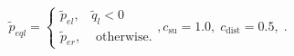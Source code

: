 \documentclass[14pt,handout,utf8]{beamer}
\begin{document}
\begin{frame}
  \vspace{-7ex}

  \begin{equation}
    \tilde{p}_{eql}
    =
    \begin{cases}
      \tilde{p}_{el}, & \tilde{q}_l < 0
      \\
      \tilde{p}_{er}, & \text{ otherwise}.
    \end{cases}
    ,
    c_\mathrm{su} = 1.0, \;  c_\mathrm{dist} = 0.5,
    \;.
    \label{atu:eq:pr_e4}
  \end{equation}



\end{frame}



\end{document}
